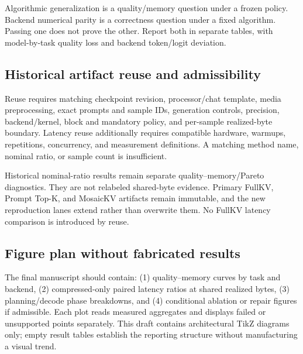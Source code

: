 Algorithmic generalization is a quality/memory question under a frozen policy.
Backend numerical parity is a correctness question under a fixed algorithm.
Passing one does not prove the other. Report both in separate tables, with
model-by-task quality loss and backend token/logit deviation.

\subsection{Historical artifact reuse and admissibility}
Reuse requires matching checkpoint revision, processor/chat template, media
preprocessing, exact prompts and sample IDs, generation controls, precision,
backend/kernel, block and mandatory policy, and per-sample realized-byte
boundary. Latency reuse additionally requires compatible hardware, warmups,
repetitions, concurrency, and measurement definitions. A matching method name,
nominal ratio, or sample count is insufficient.

Historical nominal-ratio results remain separate quality--memory/Pareto
diagnostics. They are not relabeled shared-byte evidence. Primary FullKV,
Prompt Top-K, and MosaicKV artifacts remain immutable, and the new reproduction
lanes extend rather than overwrite them. No FullKV latency comparison is
introduced by reuse.

\subsection{Figure plan without fabricated results}
The final manuscript should contain: (1) quality--memory curves by task and
backend, (2) compressed-only paired latency ratios at shared realized bytes,
(3) planning/decode phase breakdowns, and (4) conditional ablation or repair
figures if admissible. Each plot reads measured aggregates and displays failed
or unsupported points separately. This draft contains architectural TikZ
diagrams only; empty result tables establish the reporting structure without
manufacturing a visual trend.
